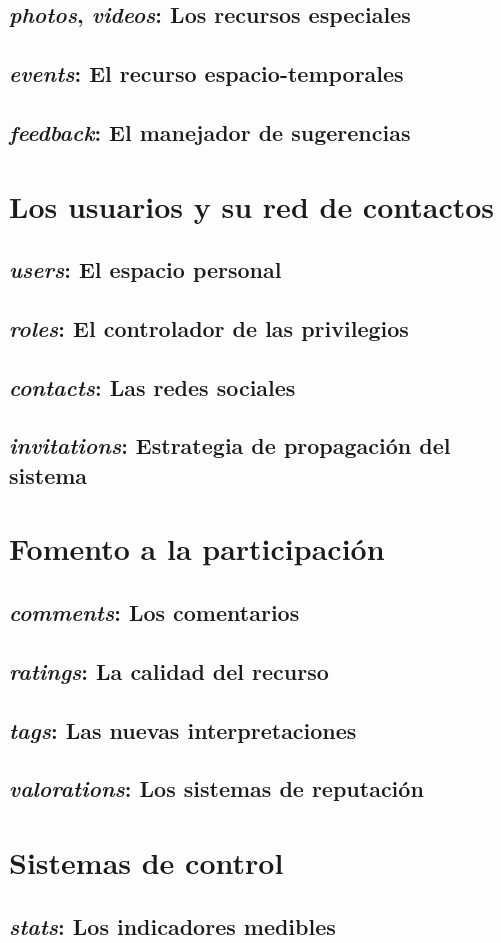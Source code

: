 \subsection{\emph{photos}, \emph{videos}: Los recursos especiales}
\subsection{\emph{events}: El recurso espacio-temporales}
\subsection{\emph{feedback}: El manejador de sugerencias}

\section{Los usuarios y su red de contactos}
\subsection{\emph{users}: El espacio personal}
\subsection{\emph{roles}: El controlador de las privilegios}
\subsection{\emph{contacts}: Las redes sociales}
\subsection{\emph{invitations}: Estrategia de propagación del sistema}

\section{Fomento a la participación}
\subsection{\emph{comments}: Los comentarios}
\subsection{\emph{ratings}: La calidad del recurso}
\subsection{\emph{tags}: Las nuevas interpretaciones}
\subsection{\emph{valorations}: Los sistemas de reputación}

\section{Sistemas de control}
\subsection{\emph{stats}: Los indicadores medibles}

